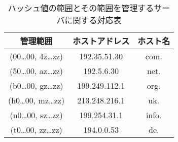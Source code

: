 \begin{table}[htb]
 \centering
 \label{tab:hash-management}
 \caption{ハッシュ値の範囲とその範囲を管理するサーバに関する対応表}
  \begin{tabular}{ccc}
    \toprule
    管理範囲 & ホストアドレス & ホスト名 \\
    \midrule
    (00…00, 4z…zz) & 192.35.51.30 & com.  \\
    (50…00, az…zz) & 192.5.6.30 & net. \\
    (b0…00, gz…zz) & 199.249.112.1 & org. \\
    (h0…00, mz…zz) & 213.248.216.1 & uk. \\
    (n0…00, sz…zz) & 199.254.31.1 & info. \\
    (t0…00, zz…zz) & 194.0.0.53 & de. \\
    \bottomrule
  \end{tabular}
\end{table}
